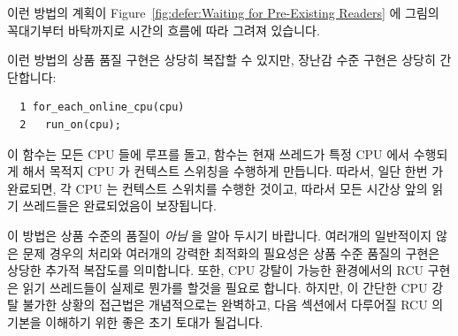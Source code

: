 이런 방법의 계획이
Figure~\ref{fig:defer:Waiting for Pre-Existing Readers} 에 그림의 꼭대기부터
바탁까지로 시간의 흐름에 따라 그려져 있습니다.

이런 방법의 상품 품질 구현은 상당히 복잡할 수 있지만, 장난감 수준 구현은 상당히
간단합니다:

\vspace{5pt}
\begin{minipage}[t]{\columnwidth}
\scriptsize
\begin{verbatim}
  1 for_each_online_cpu(cpu)
  2   run_on(cpu);
\end{verbatim}
\end{minipage}
\vspace{5pt}

이  함수는 모든 CPU 들에 루프를 돌고, 
함수는 현재 쓰레드가 특정 CPU 에서 수행되게 해서 목적지 CPU 가 컨텍스트
스위칭을 수행하게 만듭니다.
따라서, 일단 한번  가 완료되면, 각 CPU 는 컨텍스트
스위치를 수행한 것이고, 따라서 모든 시간상 앞의 읽기 쓰레드들은 완료되었음이
보장됩니다.

이 방법은 상품 수준의 품질이 \emph{아님} 을 알아 두시기 바랍니다.
여러개의 일반적이지 않은 문제 경우의 처리와 여러개의 강력한 최적화의 필요성은
상품 수준 품질의 구현은 상당한 추가적 복잡도를 의미합니다.
또한, CPU 강탈이 가능한 환경에서의 RCU 구현은 읽기 쓰레드들이 실제로 뭔가를
할것을 필요로 합니다.
하지만, 이 간단한 CPU 강탈 불가한 상황의 접근법은 개념적으로는 완벽하고, 다음
섹션에서 다루어질 RCU 의 기본을 이해하기 위한 좋은 초기 토대가 될겁니다.

